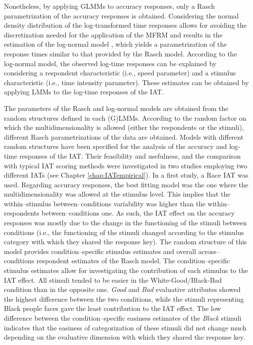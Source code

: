 \documentclass[12pt]{book}
\begin{document}
Nonetheless, by applying GLMMs to accuracy responses, only a Rasch parametrization of the accuracy responses is obtained. 
Considering the normal density distribution of the log-transformed time responses allows for avoiding the discretization needed for the application of the MFRM and results in the estimation of the log-normal model \cite{van2006}, which yields a parametrization of the response times similar to that provided by the Rasch model. 
According to the log-normal model, the observed log-time responses can be explained by considering a respondent characteristic (i.e., speed parameter) and a stimulus characteristic (i.e., time intensity parameter). These estimates can be obtained by applying LMMs to the log-time responses of the IAT. 

The parameters of the Rasch and log-normal models are obtained from the random structures defined in each (G)LMMs. According to the random factor on which the multidimensionality is allowed (either the respondents or the stimuli), different Rasch parametrizations of the data are obtained.
Models with different random structures have been specified for the analysis of the accuracy and log-time responses of the IAT.	Their feasibility and usefulness, and the comparison with typical IAT scoring methods were investigated in two studies employing two different IATs (see Chapter \ref{chap:IATempirical}). 
In a first study, a Race IAT was used. 
Regarding accuracy responses, the best fitting model was the one where the multidimensionality was allowed at the stimulus level. This implies that the within--stimulus between--conditions variability was higher than the within--respondents between--conditions one. 
As such, the IAT effect on the accuracy responses was mostly due to the change in the functioning of the stimuli between conditions (i.e., the functioning of the stimuli changed according to the stimulus category with which they shared the response key).
The random structure of this model provides condition--specific stimulus estimates and overall across--conditions respondent estimates of the Rasch model. The condition--specific stimulus estimates allow for investigating the contribution of each stimulus to the IAT effect. 
All stimuli tended to be easier in the White-Good/Black-Bad condition than in the opposite one. 
\emph{Good} and \emph{Bad} evaluative attributes showed the highest difference between the two conditions, while the stimuli representing Black people faces gave the least contribution to the IAT effect. 
 The low difference between the condition--specific easiness estimates of the  \emph{Black} stimuli indicates that the easiness of categorization of these stimuli did not change much depending on the evaluative dimension with which they shared the response key.
\end{document}
